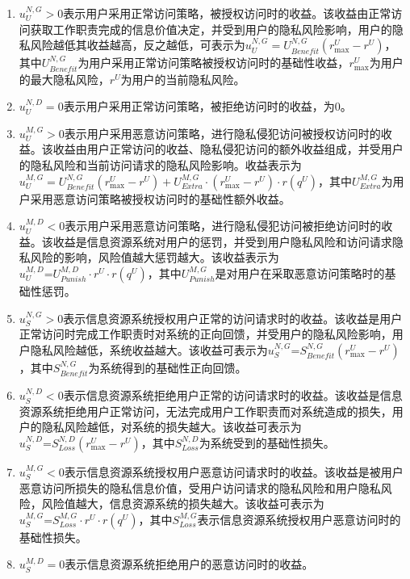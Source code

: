 \begin{enumerate}
	\item  $u_{U}^{N,G}>0$表示用户采用正常访问策略，被授权访问时的收益。该收益由正常访问获取工作职责完成的信息价值决定，并受到用户的隐私风险影响，用户的隐私风险越低其收益越高，反之越低，可表示为$u_{U}^{N,G}=U_{Benefit}^{N,G}(r_{\max }^{U}-{{r}^{U}})$，其中$U_{Benefit}^{N,G}$为用户采用正常访问策略被授权访问时的基础性收益，$r_{\max }^{U}$为用户的最大隐私风险，${{r}^{U}}$为用户的当前隐私风险。
	\item  $u_{U}^{N,D}=0$表示用户采用正常访问策略，被拒绝访问时的收益，为0。
	\item  $u_{U}^{M,G}>0$表示用户采用恶意访问策略，进行隐私侵犯访问被授权访问时的收益。该收益由用户正常访问的收益、隐私侵犯访问的额外收益组成，并受用户的隐私风险和当前访问请求的隐私风险影响。收益表示为$u_{U}^{M,G}=U_{Benefit}^{N,G}(r_{\max }^{U}-{{r}^{U}})+U_{Extra}^{M,G}\cdot (r_{\max }^{U}-{{r}^{U}})\cdot r({{q}^{U}})$，其中$U_{Extra}^{M,G}$为用户采用恶意访问策略被授权访问时的基础性额外收益。
	\item  $u_{U}^{M,D}<0$表示用户采用恶意访问策略，进行隐私侵犯访问被拒绝访问时的收益。该收益是信息资源系统对用户的惩罚，并受到用户隐私风险和访问请求隐私风险的影响，风险值越大惩罚越大。该收益表示为$u_{U}^{M,D}\text{=}U_{Punish}^{M,D}\cdot {{r}^{U}}\cdot r({{q}^{U}})$，其中$U_{Punish}^{M,G}$是对用户在采取恶意访问策略时的基础性惩罚。
	\item  $u_{S}^{N,G}>0$表示信息资源系统授权用户正常的访问请求时的收益。该收益是用户正常访问时完成工作职责时对系统的正向回馈，并受用户的隐私风险影响，用户隐私风险越低，系统收益越大。该收益可表示为$u_{S}^{N,G}\text{=}S_{Benefit}^{N,G}(r_{\max }^{U}-{{r}^{U}})$，其中$S_{Benefit}^{N,G}$为系统得到的基础性正向回馈。
	\item $u_{S}^{N,D}<0$表示信息资源系统拒绝用户正常的访问请求时的收益。该收益是信息资源系统拒绝用户正常访问，无法完成用户工作职责而对系统造成的损失，用户的隐私风险越低，对系统的损失越大。该收益可表示为$u_{S}^{N,D}\text{=}S_{Loss}^{N,D}(r_{\max }^{U}-{{r}^{U}})$，其中$S_{Loss}^{N,D}$为系统受到的基础性损失。
	\item  $u_{S}^{M,G}<0$表示信息资源系统授权用户恶意访问请求时的收益。该收益是被用户恶意访问所损失的隐私信息价值，受用户访问请求的隐私风险和用户隐私风险，风险值越大，信息资源系统的损失越大。该收益可表示为$u_{S}^{M,G}\text{=}S_{Loss}^{M,G}\cdot {{r}^{U}}\cdot r({{q}^{U}})$，其中$S_{Loss}^{M,G}$表示信息资源系统授权用户恶意访问时的基础性损失。
	\item $u_{S}^{M,D}=0$表示信息资源系统拒绝用户的恶意访问时的收益。
\end{enumerate}


